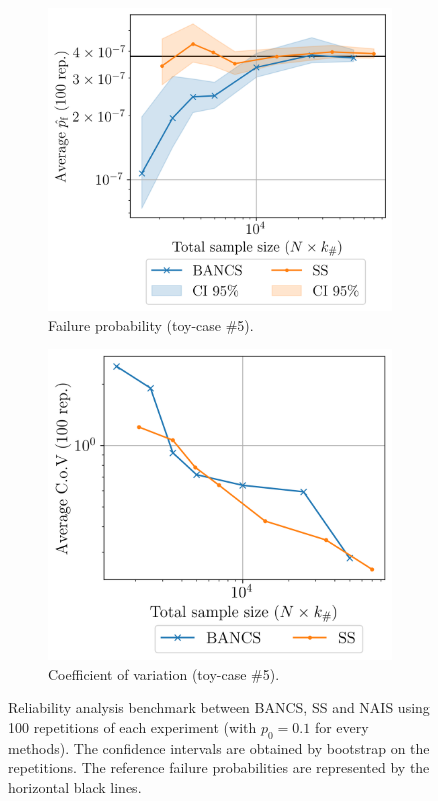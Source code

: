 \begin{figure}
    \begin{subfigure}[b]{0.49\linewidth}
        \centering
        \includegraphics[width=\linewidth]{part3/figures/BANCS/Oscillator_mean.png}
        \caption{Failure probability (toy-case \#5).}
    \end{subfigure}
    \begin{subfigure}[b]{0.47\linewidth}
        \centering
        \includegraphics[width=\linewidth]{part3/figures/BANCS/Oscillator_cov.png}
        \caption{Coefficient of variation (toy-case \#5).}
    \end{subfigure}
    \caption{Reliability analysis benchmark between BANCS, SS and NAIS using 100 repetitions of each experiment (with $p_0=0.1$ for every methods). 
                The confidence intervals are obtained by bootstrap on the repetitions. 
                The reference failure probabilities are represented by the horizontal black lines.}
    \label{fig:bancs_benchmark}
\end{figure}

